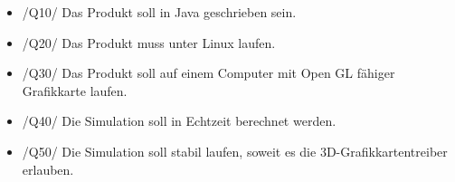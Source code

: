 \begin{itemize}

\item  /Q10/ Das Produkt soll in Java geschrieben sein.
\item  /Q20/ Das Produkt muss unter Linux laufen.
\item  /Q30/ Das Produkt soll auf einem Computer mit Open GL fähiger Grafikkarte laufen.
\item  /Q40/ Die Simulation soll in Echtzeit berechnet werden.
\item  /Q50/ Die Simulation soll stabil laufen, soweit es die 3D-Grafikkartentreiber erlauben.

\end{itemize}

